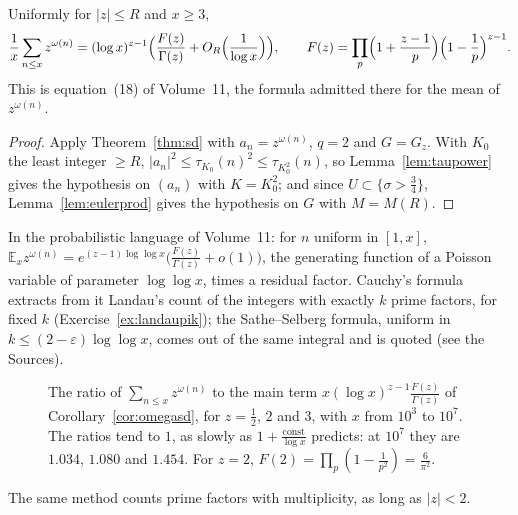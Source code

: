 \begin{corollary}[Selberg, 1954]\label{cor:omegasd}
Uniformly for $|z|\le R$ and $x\ge3$,
\[
\frac1x\sum_{n\le x}z^{\omega(n)}=(\log x)^{z-1}\Bigl(\frac{F(z)}{\Gamma(z)}+O_R\Bigl(\frac1{\log x}\Bigr)\Bigr),\qquad F(z)=\prod_p\Bigl(1+\frac{z-1}p\Bigr)\Bigl(1-\frac1p\Bigr)^{z-1}.
\]
This is equation~(18) of Volume~11, the formula admitted there for the mean of $z^{\omega(n)}$.
\end{corollary}
\begin{proof}
Apply Theorem~\ref{thm:sd} with $a_n=z^{\omega(n)}$, $q=2$ and $G=G_z$. With $K_0$ the least integer $\ge R$, $|a_n|^2\le\tau_{K_0}(n)^2\le\tau_{K_0^2}(n)$, so Lemma~\ref{lem:taupower} gives the hypothesis on $(a_n)$ with $K=K_0^2$; and since $U\subset\{\sigma>\frac34\}$, Lemma~\ref{lem:eulerprod} gives the hypothesis on $G$ with $M=M(R)$.
\end{proof}

In the probabilistic language of Volume~11: for $n$ uniform in $[1,x]$, $\mathbb E_xz^{\omega(n)}=e^{(z-1)\log\log x}\bigl(\frac{F(z)}{\Gamma(z)}+o(1)\bigr)$, the generating function of a Poisson variable of parameter $\log\log x$, times a residual factor. Cauchy's formula extracts from it Landau's count of the integers with exactly $k$ prime factors, for fixed $k$ (Exercise~\ref{ex:landaupik}); the Sathe--Selberg formula, uniform in $k\le(2-\varepsilon)\log\log x$, comes out of the same integral and is quoted (see the Sources).

\begin{figure}[ht]
\centering{}
\caption{The ratio of $\sum_{n\le x}z^{\omega(n)}$ to the main term $x(\log x)^{z-1}\frac{F(z)}{\Gamma(z)}$ of Corollary~\ref{cor:omegasd}, for $z=\frac12$, $2$ and $3$, with $x$ from $10^3$ to $10^7$. The ratios tend to $1$, as slowly as $1+\frac{\text{const}}{\log x}$ predicts: at $10^7$ they are $1.034$, $1.080$ and $1.454$. For $z=2$, $F(2)=\prod_p(1-\frac1{p^2})=\frac6{\pi^2}$.}
\label{fig:sdratio}
\end{figure}

The same method counts prime factors with multiplicity, as long as $|z|<2$.

